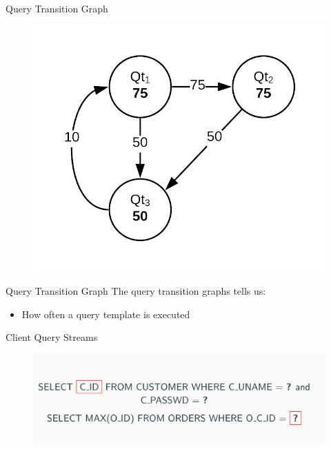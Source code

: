 \documentclass[10pt]{beamer}
\begin{document}
\begin{frame}[fragile]{Query Transition Graph}
    \begin{figure}
        \includegraphics[scale=0.2]{apollo_transition_graph}
    \end{figure}
\end{frame}

\begin{frame}[fragile]{Query Transition Graph}
    The query transition graphs tells us:
    \begin{itemize}
        \item{How often a query template is executed}
    \end{itemize}
\end{frame}

\begin{frame}[fragile]{Client Query Streams}
    \begin{figure}
        \includegraphics[scale=0.25]{apollo_parameter_mappings}
    \end{figure}
\end{frame}
\end{document}
